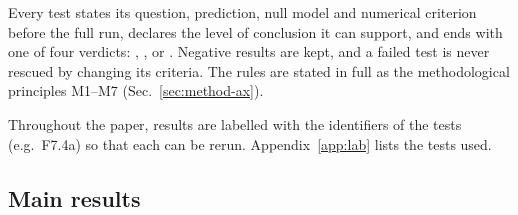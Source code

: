 Every test states its question, prediction, null model and numerical criterion before the full run,
declares the level of conclusion it can support, and ends with one of four verdicts:
, ,  or . Negative
results are kept, and a failed test is never rescued by changing its criteria. The rules are stated
in full as the methodological principles M1--M7 (Sec.~\ref{sec:method-ax}).

Throughout the paper, results are labelled with the identifiers of the tests (e.g.\ F7.4a) so that
each can be rerun. Appendix~\ref{app:lab} lists the tests used.

\subsection{Main results}

